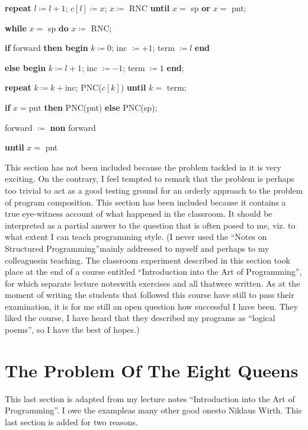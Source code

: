 \quad \quad \textbf{repeat} $l\coloneq l + 1$; $c[l]\coloneq x$; $x \coloneq$ RNC \textbf{until} $x =$ sp \textbf{or} $x =$ pnt;

\quad \quad \textbf{while} $x =$ sp \textbf{do} $x\coloneq$ RNC;

\quad \quad \textbf{if} forward \textbf{then begin} $k\coloneq 0$; inc $\coloneq + 1$; term $\coloneq l$ \textbf{end}

\quad \quad\quad \textbf{else begin} $k\coloneq l + 1$; inc $\coloneq -1$; term $\coloneq 1$ \textbf{end};

\quad \quad \textbf{repeat} $k\coloneq k + \text{inc}$; PNC($c[k]$) \textbf{until} $k =$ term;

\quad \quad \textbf{if} $x = \text{pnt}$ \textbf{then} PNC(pnt) \textbf{else} PNC(sp);

\quad \quad forward $\coloneq$ \textbf{non} forward

\quad \textbf{until} $x =$ pnt

This section has not been included because the problem tackled in it is very exciting. On the contrary, I feel tempted to remark that the problem is perhaps too trivial to act as a good testing ground for an orderly approach to the problem of program composition. This section has been included because it contains a true eye-witness account of what happened in the classroom. It should be interpreted as a partial answer to the question that is often posed to me, viz. to what extent I can teach programming style. (I never used the ``Notes on Structured Programming''\textemdash{}mainly addressed to myself and perhaps to my colleagues\textemdash{}in teaching. The classroom experiment described in this section took place at the end of a course entitled ``Introduction into the Art of Programming'', for which separate lecture notes\textemdash{}with exercises and all that\textemdash{}were written. As at the moment of writing the students that followed this course have still to pass their examination, it is for me still an open question how successful I have been. They liked the course, I have heard that they described my programs as ``logical poems'', so I have the best of hopes.)

\section[The problem of the eight queens]{The Problem Of The Eight Queens}

This last section is adapted from my lecture notes ``Introduction into the Art of Programming''. I owe the example\textemdash{}as many other good ones\textemdash{}to Niklaus Wirth. This last section is added for two reasons.

